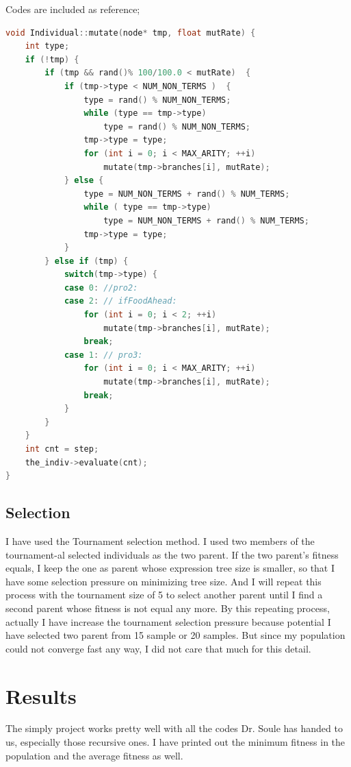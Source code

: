 \documentclass[10pt,b5paper]{article}
\begin{document}
Codes are included as reference; 
\begin{lstlisting}[language=c++]
void Individual::mutate(node* tmp, float mutRate) {
    int type;
    if (!tmp) {
        if (tmp && rand()% 100/100.0 < mutRate)  {
            if (tmp->type < NUM_NON_TERMS )  {
                type = rand() % NUM_NON_TERMS;
                while (type == tmp->type)               
                    type = rand() % NUM_NON_TERMS; 
                tmp->type = type;
                for (int i = 0; i < MAX_ARITY; ++i)
                    mutate(tmp->branches[i], mutRate);
            } else {
                type = NUM_NON_TERMS + rand() % NUM_TERMS;
                while ( type == tmp->type)
                    type = NUM_NON_TERMS + rand() % NUM_TERMS;
                tmp->type = type;
            }
        } else if (tmp) {    
            switch(tmp->type) {
            case 0: //pro2:
            case 2: // ifFoodAhead:
                for (int i = 0; i < 2; ++i)
                    mutate(tmp->branches[i], mutRate);
                break;
            case 1: // pro3:
                for (int i = 0; i < MAX_ARITY; ++i)
                    mutate(tmp->branches[i], mutRate);
                break;
            }
        }
    }
    int cnt = step;
    the_indiv->evaluate(cnt);
}
\end{lstlisting}
\subsection{Selection}
\label{sec-1-5}
I have used the Tournament selection method. I used two members of the tournament-al selected individuals as the two parent. If the two parent's fitness equals, I keep the one as parent whose expression tree size is smaller, so that I have some selection pressure on minimizing tree size. And I will repeat this process with the tournament size of 5 to select another parent until I find a second parent whose fitness is not equal any more. By this repeating process, actually I have increase the tournament selection pressure because potential I have selected two parent from 15 sample or 20 samples. But since my population could not converge fast any way, I did not care that much for this detail. 
\section{Results}
\label{sec-2}
The simply project works pretty well with all the codes Dr. Soule has handed to us, especially those recursive ones. I have printed out the minimum fitness in the population and the average fitness as well. 
\end{document}
